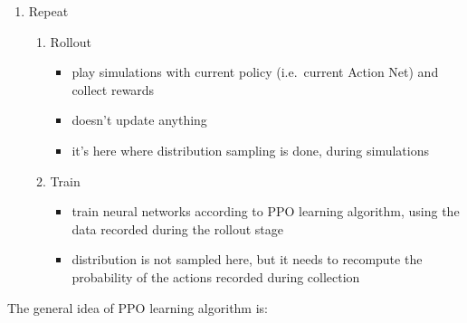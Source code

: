 \documentclass[
  letterpaper,
  DIV=11,
  numbers=noendperiod]{scrartcl}
\providecommand{\tightlist}{%
  \setlength{\itemsep}{0pt}\setlength{\parskip}{0pt}}
\begin{document}
\begin{enumerate}
\def\labelenumi{\arabic{enumi}.}
\tightlist
\item
  Repeat

  \begin{enumerate}
  \def\labelenumii{\arabic{enumii}.}
  \tightlist
  \item
    Rollout

    \begin{itemize}
    \tightlist
    \item
      play simulations with current policy (i.e.~current Action Net) and
      collect rewards
    \item
      doesn't update anything
    \item
      it's here where distribution sampling is done, during simulations
    \end{itemize}
  \item
    Train

    \begin{itemize}
    \tightlist
    \item
      train neural networks according to PPO learning algorithm, using
      the data recorded during the rollout stage
    \item
      distribution is not sampled here, but it needs to recompute the
      probability of the actions recorded during collection
    \end{itemize}
  \end{enumerate}
\end{enumerate}

The general idea of PPO learning algorithm is:
\end{document}
